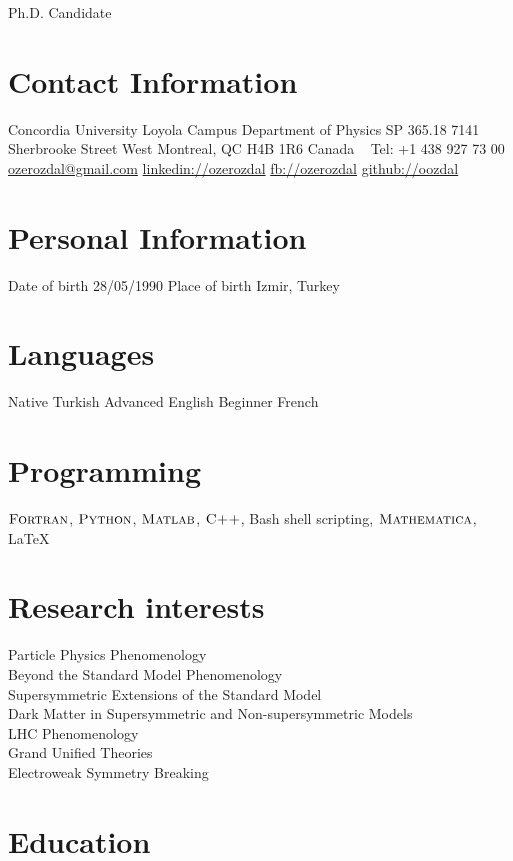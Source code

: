 \documentclass[]{friggeri-cv}
\begin{document}
       {Ph.D. Candidate}


\begin{aside}
  \section{Contact Information}
    Concordia University
    Loyola Campus
    Department of Physics SP 365.18
    7141 Sherbrooke Street West
    Montreal, QC  H4B 1R6
    Canada
    ~
    Tel: +1 438 927 73 00
    \href{mailto:ozerozdal@gmail.com}{ozerozdal@gmail.com}
    \href{http://www.linkedin.com/in/ozerozdal/}{linkedin://ozerozdal}
    \href{http://facebook.com/ozerozdal}{fb://ozerozdal}
    \href{http://github.com/oozdal}{github://oozdal}
  \section{Personal Information}
  	Date of birth 28/05/1990
  	Place of birth
  	Izmir, Turkey
  \section{Languages}
    Native Turkish
    Advanced English 
    Beginner French
  \section{Programming}
    $\textsc{Fortran}$, $\textsc{Python}$, 
    $\textsc{Matlab}$, $\textsc{C++}$,
    Bash shell scripting,
    $\textsc{Mathematica}$, LaTeX
\end{aside}

\section{Research interests}

Particle Physics Phenomenology \\
Beyond the Standard Model Phenomenology \\
Supersymmetric Extensions of the Standard Model \\
Dark Matter in Supersymmetric and Non-supersymmetric Models \\
LHC Phenomenology \\
Grand Unified Theories \\
Electroweak Symmetry Breaking \\

\section{Education}
\end{document}
